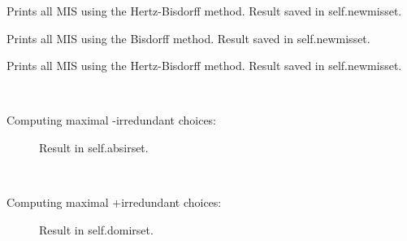 \documentclass[letterpaper,10pt,english]{sphinxmanual}
\begin{document}
\begin{fulllineitems}
\begin{fulllineitems}
\label{techDoc:digraphs.Digraph.showMIS_HB2}
Prints all MIS using the Hertz-Bisdorff method.
Result saved in self.newmisset.

\end{fulllineitems}


\begin{fulllineitems}
\label{techDoc:digraphs.Digraph.showMIS_RB}
Prints all MIS using the Bisdorff method.
Result saved in self.newmisset.

\end{fulllineitems}


\begin{fulllineitems}
\label{techDoc:digraphs.Digraph.showMIS_UD}
Prints all MIS using the Hertz-Bisdorff method.
Result saved in self.newmisset.

\end{fulllineitems}


\begin{fulllineitems}
\label{techDoc:digraphs.Digraph.showMaxAbsIrred}~\begin{description}
\item[{Computing maximal -irredundant choices:}] \leavevmode
Result in self.absirset.

\end{description}

\end{fulllineitems}


\begin{fulllineitems}
\label{techDoc:digraphs.Digraph.showMaxDomIrred}~\begin{description}
\item[{Computing maximal +irredundant choices:}] \leavevmode
Result in self.domirset.


\end{description}
\end{fulllineitems}
\end{fulllineitems}
\end{document}
